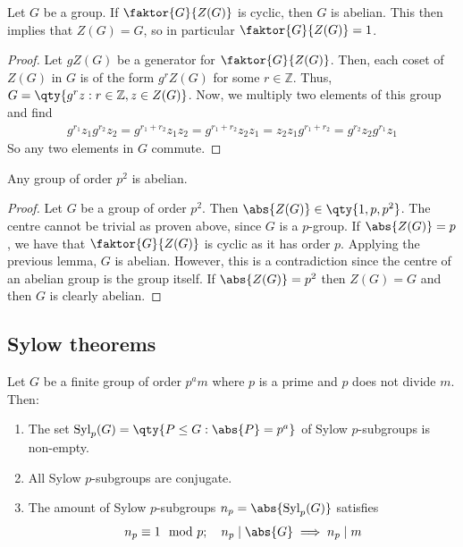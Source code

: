 \begin{lemma}
	Let $G$ be a group.
	If $\faktor{G}{Z(G)}$ is cyclic, then $G$ is abelian.
	This then implies that $Z(G) = G$, so in particular $\faktor{G}{Z(G)} = 1$.
\end{lemma}

\begin{proof}
	Let $g Z(G)$ be a generator for $\faktor{G}{Z(G)}$.
	Then, each coset of $Z(G)$ in $G$ is of the form $g^r Z(G)$ for some $r \in \mathbb Z$.
	Thus, $G = \qty{g^r z : r \in \mathbb Z, z \in Z(G)}$.
	Now, we multiply two elements of this group and find
	\begin{align*}
		g^{r_1} z_1 g^{r_2} z_2 = g^{r_1 + r_2} z_1 z_2 = g^{r_1 + r_2} z_2 z_1 = z_2 z_1 g^{r_1 + r_2} = g^{r_2} z_2 g^{r_1} z_1
	\end{align*}
	So any two elements in $G$ commute.
\end{proof}

\begin{corollary}
	Any group of order $p^2$ is abelian.
\end{corollary}

\begin{proof}
	Let $G$ be a group of order $p^2$.
	Then $\abs{Z(G)} \in \qty{1, p, p^2}$.
	The centre cannot be trivial as proven above, since $G$ is a $p$-group.
	If $\abs{Z(G)} = p$, we have that $\faktor{G}{Z(G)}$ is cyclic as it has order $p$.
	Applying the previous lemma, $G$ is abelian.
	However, this is a contradiction since the centre of an abelian group is the group itself.
	If $\abs{Z(G)} = p^2$ then $Z(G) = G$ and then $G$ is clearly abelian.
\end{proof}

\subsection{Sylow theorems}
\begin{theorem}
	Let $G$ be a finite group of order $p^a m$ where $p$ is a prime and $p$ does not divide $m$.
	Then:
	\begin{enumerate}
		\item The set $\mathrm{Syl}_p(G) = \qty{P \leq G : \abs{P} = p^a}$ of Sylow $p$-subgroups is non-empty.
		\item All Sylow $p$-subgroups are conjugate.
		\item The amount of Sylow $p$-subgroups $n_p = \abs{\mathrm{Syl}_p(G)}$ satisfies
		      \begin{align*}
			      n_p \equiv 1 \mod p;\quad n_p \mid \abs{G} \implies n_p \mid m
		      \end{align*}
	\end{enumerate}
\end{theorem}

